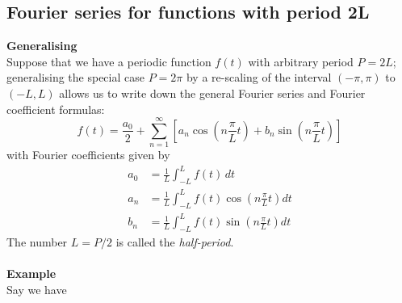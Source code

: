 \documentclass{report}
\begin{document}
\subsection{Fourier series for functions with period 2L}
\textbf{Generalising}\\
Suppose that we have a periodic function $f(t)$ with arbitrary period $P=2L$; generalising the special case
$P=2\pi$ by a re-scaling of the interval $(-\pi,\pi)$ to
$(-L,L)$ allows us to write down the general Fourier series and Fourier coefficient formulas:
\begin{equation*}
f(t)=\frac{a_0}{2}+\sum^\infty_{n=1}\left[a_n\cos\left(n\frac{\pi}{L}t\right)
+b_n\sin\left(n\frac{\pi}{L}t\right)\right]
\end{equation*}
with Fourier coefficients given by
\begin{align*}
a_0&=\frac{1}{L}\int^L_{-L}f(t)\,dt\\
a_n&=\frac{1}{L}\int^L_{-L}f(t)\cos\left(n\frac{\pi}{L}t\right)dt\\
b_n&=\frac{1}{L}\int^L_{-L}f(t)\sin\left(n\frac{\pi}{L}t\right)dt
\end{align*}
The number $L=P/2$ is called the \textit{half-period}.\\
\vspace{1mm}\\
\textbf{Example}\\
Say we have
\end{document}

